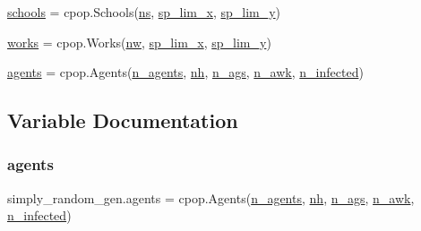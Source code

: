 \begin{DoxyCompactItemize}
\hyperlink{namespacesimply__random__gen_affce97fc974f34e8307f80e156aac92c}{schools} = cpop.\+Schools(\hyperlink{namespacesimply__random__gen_a721e7874c49707de4c808d3ab54df4b7}{ns}, \hyperlink{namespacesimply__random__gen_a55170e2a04f67ec4f79d82c14941cf12}{sp\+\_\+lim\+\_\+x}, \hyperlink{namespacesimply__random__gen_a2685d02e22bbd9a87d4bcfd842a2fa10}{sp\+\_\+lim\+\_\+y})
\item 
\hyperlink{namespacesimply__random__gen_a0326486890886dd27c10c37efd54f416}{works} = cpop.\+Works(\hyperlink{namespacesimply__random__gen_ad8ddbf1221f0677a8da924e9dd0672d8}{nw}, \hyperlink{namespacesimply__random__gen_a55170e2a04f67ec4f79d82c14941cf12}{sp\+\_\+lim\+\_\+x}, \hyperlink{namespacesimply__random__gen_a2685d02e22bbd9a87d4bcfd842a2fa10}{sp\+\_\+lim\+\_\+y})
\item 
\hyperlink{namespacesimply__random__gen_af03579f468d445b7a2f1eb4e994bfc40}{agents} = cpop.\+Agents(\hyperlink{namespacesimply__random__gen_ade2e4043b0d8e4226396fb5e9ce0ba52}{n\+\_\+agents}, \hyperlink{namespacesimply__random__gen_a24ebe262faded948e24bd761f4ad30bd}{nh}, \hyperlink{namespacesimply__random__gen_af01c9c6a78cec4cc8e9ff2c2aad3193a}{n\+\_\+ags}, \hyperlink{namespacesimply__random__gen_a646fa4f0c8916280e34b24c932648a86}{n\+\_\+awk}, \hyperlink{namespacesimply__random__gen_af3390662c6fd8da61ea1caee49236115}{n\+\_\+infected})
\end{DoxyCompactItemize}


\subsection{Variable Documentation}
\mbox{\label{namespacesimply__random__gen_af03579f468d445b7a2f1eb4e994bfc40}} 
\subsubsection{\texorpdfstring{agents}{agents}}
{\footnotesize\ttfamily simply\+\_\+random\+\_\+gen.\+agents = cpop.\+Agents(\hyperlink{namespacesimply__random__gen_ade2e4043b0d8e4226396fb5e9ce0ba52}{n\+\_\+agents}, \hyperlink{namespacesimply__random__gen_a24ebe262faded948e24bd761f4ad30bd}{nh}, \hyperlink{namespacesimply__random__gen_af01c9c6a78cec4cc8e9ff2c2aad3193a}{n\+\_\+ags}, \hyperlink{namespacesimply__random__gen_a646fa4f0c8916280e34b24c932648a86}{n\+\_\+awk}, \hyperlink{namespacesimply__random__gen_af3390662c6fd8da61ea1caee49236115}{n\+\_\+infected})}

